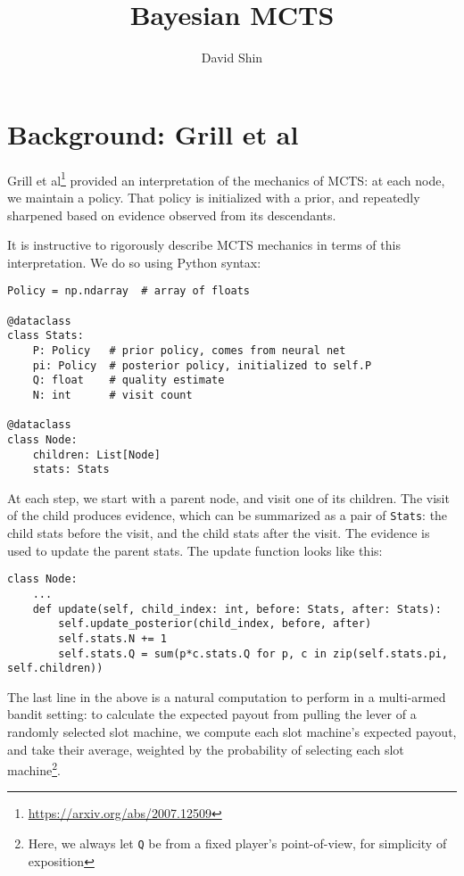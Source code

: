 \documentclass[tikz]{article}
\title{Bayesian MCTS}
\author{David Shin}
\begin{document}
\maketitle

\section{Background: Grill et al}

Grill et al\footnote{\url{https://arxiv.org/abs/2007.12509}} provided an interpretation of the mechanics of MCTS: at each node, 
we maintain a policy. That policy is initialized with a prior, and repeatedly sharpened based on evidence observed from its descendants. \newline

It is instructive to rigorously describe MCTS mechanics in terms of this interpretation. We do so using Python syntax:

\begin{tcolorbox}
\begin{verbatim}
Policy = np.ndarray  # array of floats

@dataclass
class Stats:
    P: Policy   # prior policy, comes from neural net
    pi: Policy  # posterior policy, initialized to self.P
    Q: float    # quality estimate
    N: int      # visit count

@dataclass
class Node:
    children: List[Node]
    stats: Stats
\end{verbatim}
\end{tcolorbox}

At each step, we start with a parent node, and visit one of its children. The visit of the child produces evidence, 
which can be summarized as a pair of \texttt{Stats}: the child stats before the visit, 
and the child stats after the visit. The evidence is used to update the parent stats. The update function looks like this:

\begin{tcolorbox}
\begin{verbatim}
class Node:
    ...
    def update(self, child_index: int, before: Stats, after: Stats):
        self.update_posterior(child_index, before, after)
        self.stats.N += 1
        self.stats.Q = sum(p*c.stats.Q for p, c in zip(self.stats.pi, self.children))
\end{verbatim}
\end{tcolorbox}

The last line in the above is a natural computation to perform in a multi-armed bandit setting: 
to calculate the expected payout from pulling the lever of a randomly selected slot machine, 
we compute each slot machine's expected payout, and take their average, weighted by the probability of
selecting each slot machine\footnote{Here, we always let \texttt{Q} be from a fixed player's point-of-view, for simplicity of exposition}. \newline
\end{document}
